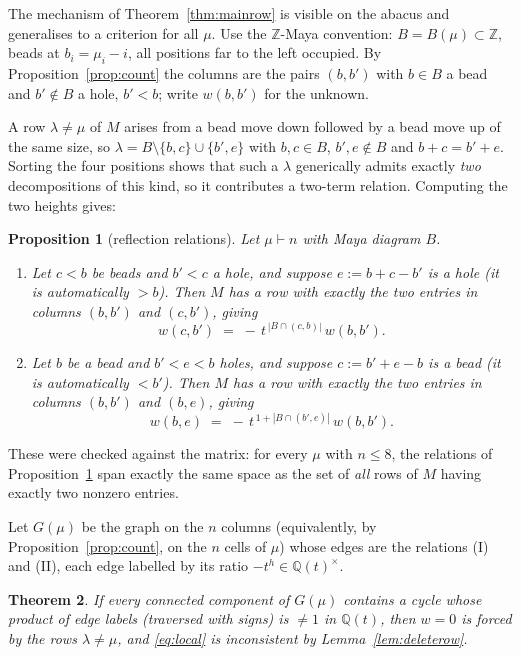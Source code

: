 \documentclass[11pt]{article}
\newtheorem{theorem}{Theorem}[section]
\newtheorem{proposition}[theorem]{Proposition}
\theoremstyle{definition}
\newcommand{\Q}{\mathbb{Q}}
\newcommand{\Z}{\mathbb{Z}}
\begin{document}
The mechanism of Theorem~\ref{thm:mainrow} is visible on the abacus and generalises to a
criterion for all $\mu$. Use the $\Z$-Maya convention: $B=B(\mu)\subset\Z$, beads at
$b_i=\mu_i-i$, all positions far to the left occupied. By Proposition~\ref{prop:count} the
columns are the pairs $(b,b')$ with $b\in B$ a bead and $b'\notin B$ a hole, $b'<b$; write
$w(b,b')$ for the unknown.

A row $\lambda\ne\mu$ of $M$ arises from a bead move down followed by a bead move up of the
same size, so $\lambda=B\setminus\{b,c\}\cup\{b',e\}$ with $b,c\in B$, $b',e\notin B$ and
$b+c=b'+e$. Sorting the four positions shows that such a $\lambda$ generically admits exactly
\emph{two} decompositions of this kind, so it contributes a two-term relation. Computing the
two heights gives:

\begin{proposition}[reflection relations]\label{prop:reflect}
Let $\mu\vdash n$ with Maya diagram $B$.
\begin{enumerate}
\item[(I)] Let $c<b$ be beads and $b'<c$ a hole, and suppose $e:=b+c-b'$ is a hole (it is
automatically $>b$). Then $M$ has a row with exactly the two entries in columns $(b,b')$ and
$(c,b')$, giving
\[
   w(c,b')\;=\;-\,t^{\,|B\cap(c,b)|}\,w(b,b').
\]
\item[(II)] Let $b$ be a bead and $b'<e<b$ holes, and suppose $c:=b'+e-b$ is a bead (it is
automatically $<b'$). Then $M$ has a row with exactly the two entries in columns $(b,b')$ and
$(b,e)$, giving
\[
   w(b,e)\;=\;-\,t^{\,1+|B\cap(b',e)|}\,w(b,b').
\]
\end{enumerate}
\end{proposition}

These were checked against the matrix: for every $\mu$ with $n\le8$, the relations of
Proposition~\ref{prop:reflect} span exactly the same space as the set of \emph{all} rows of
$M$ having exactly two nonzero entries.

Let $G(\mu)$ be the graph on the $n$ columns (equivalently, by Proposition~\ref{prop:count},
on the $n$ cells of $\mu$) whose edges are the relations (I) and (II), each edge labelled by
its ratio $-t^{h}\in\Q(t)^{\times}$.

\begin{theorem}\label{thm:graph}
If every connected component of $G(\mu)$ contains a cycle whose product of edge labels
(traversed with signs) is $\ne1$ in $\Q(t)$, then $w=0$ is forced by the rows
$\lambda\ne\mu$, and \eqref{eq:local} is inconsistent by Lemma~\ref{lem:deleterow}.
\end{theorem}
\end{document}
